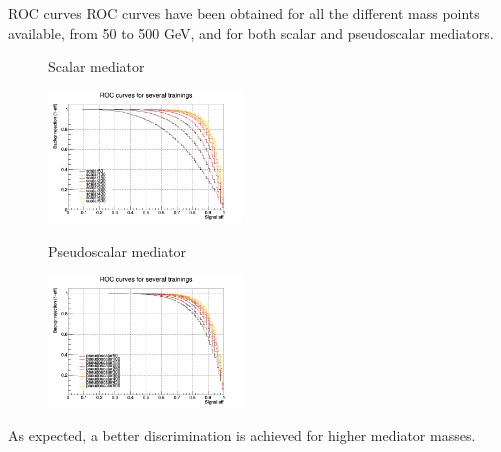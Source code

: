 \documentclass[8pt]{beamer}
\begin{document}
\begin{frame}{ROC curves}
\justifying
ROC curves have been obtained for all the different mass points available, from 50 to 500 GeV, and for both scalar and pseudoscalar mediators. \vfill
\begin{figure}[htbp]
\centering
\begin{minipage}[b]{.49\textwidth}
\vspace{-5pt}
\begin{block}{\centering Scalar mediator}\end{block}
\begin{center}
\includegraphics[width=5.2cm, height=3.5cm]{figs/groupedROC_scalar.png}
\end{center}
\end{minipage}
\begin{minipage}[b]{.02\textwidth}\end{minipage}
\begin{minipage}[b]{.49\textwidth}
\vspace{-5pt}
\begin{block}{\centering Pseudoscalar mediator}\end{block}
\begin{center}
\includegraphics[width=5.2cm, height=3.5cm]{figs/groupedROC_pseudo.png}
\end{center}
\end{minipage}
\end{figure} \vfill
As expected, a better discrimination is achieved for higher mediator masses. \vfill
\end{frame}
\end{document}
